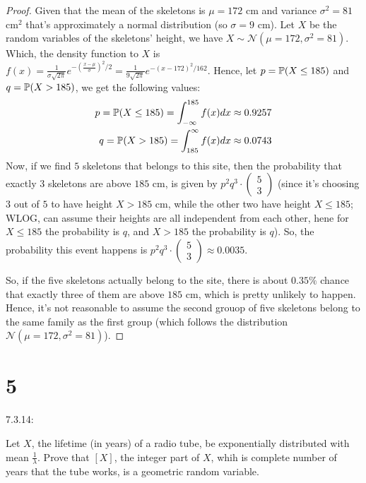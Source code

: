 \documentclass{article}
\begin{document}
\begin{proof}
    Given that the mean of the skeletons is $\mu=172$ cm and variance $\sigma^2 = 81$ cm$ ^2$ that's approximately a normal distribution (so $\sigma = 9$ cm). Let $X$ be the random variables of the skeletons' height, we have $X\sim \mathcal{N}(\mu=172,\sigma^2=81)$. Which, the density function to $X$ is $f(x)=\frac{1}{\sigma\sqrt{2\pi}}e^{-(\frac{x-\mu}{\sigma})^2/2} = \frac{1}{9\sqrt{2\pi}}e^{-(x-172)^2/162}$. Hence, let $p=\mathbb{P}(X\leq 185)$ and $ q=\mathbb{P}(X>185)$, we get the following values:
    \begin{align}
        p=\mathbb{P}(X\leq 185) = \int_{-\infty}^{185}f(x)dx \approx 0.9257\\
        q=\mathbb{P}(X>185) = \int_{185}^\infty f(x)dx \approx 0.0743
    \end{align}
    Now, if we find $5$ skeletons that belongs to this site, then the probability that exactly $3$ skeletons are above $185$ cm, is given by $p^2 q^3 \cdot\begin{pmatrix}5\\3\end{pmatrix}$ (since it's choosing $3$ out of $5$ to have height $X>185$ cm, while the other two have height $X\leq 185$; WLOG, can assume their heights are all independent from each other, hene for $X\leq 185$ the probability is $q$, and $X>185$ the probability is $q$). So, the probability this event happens is $p^2 q^3\cdot\begin{pmatrix}5\\3\end{pmatrix}\approx 0.0035$. 
    
    So, if the five skeletons actually belong to the site, there is about $0.35\%$ chance that exactly three of them are above $185$ cm, which is pretty unlikely to happen. Hence, it's not reasonable to assume the second grouop of five skeletons belong to the same family as the first group (which follows the distribution $\mathcal{N}(\mu=172,\sigma^2=81)$).
\end{proof}

\hfil

\section*{5}
\begin{ques}\label{q5}
    7.3.14:

    Let $X$, the lifetime (in years) of a radio tube, be exponentially distributed with mean $\frac{1}{\lambda}$. Prove that $[X]$, the integer part of $X$, whih is complete number of years that the tube works, is a geometric random variable.
\end{ques}
\end{document}
